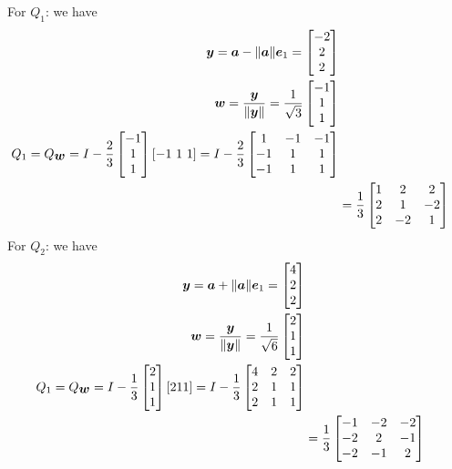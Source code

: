 \documentclass[12pt,a4paper]{article}
\def\a{ {\vc a} }
\def\e{ {\vc e} }
\def\y{ {\vc y} }
\def\w{ {\vc w} }
\begin{document}
For $Q_1$: we have
\begin{align*}
\ensuremath{\bm{\y}} = \ensuremath{\bm{\a}} - \| \ensuremath{\bm{\a}}\| \ensuremath{\bm{\e}}_1 =  \begin{bmatrix} -2 \\ 2 \\ 2 \end{bmatrix} \\
\ensuremath{\bm{\w}} = {\ensuremath{\bm{\y}} \over \|\ensuremath{\bm{\y}}\|} = {1 \over \sqrt{3}} \begin{bmatrix} -1 \\ 1 \\ 1 \end{bmatrix} \\
Q_1 = Q_{\ensuremath{\bm{\w}}} = I - {2 \over 3} \begin{bmatrix} -1 \\ 1 \\ 1 \end{bmatrix}  [-1\ 1\ 1] = 
I - {2 \over 3} \begin{bmatrix} 1 & -1 & -1 \\ -1 & 1 & 1 \\ -1 & 1 & 1 \end{bmatrix} \\
&={1 \over 3} \begin{bmatrix} 1 & 2 & 2 \\ 2 & 1 & -2 \\ 2 & -2 & 1 \end{bmatrix} 
\end{align*}
For $Q_2$: we have
\begin{align*}
\ensuremath{\bm{\y}} = \ensuremath{\bm{\a}} + \| \ensuremath{\bm{\a}}\| \ensuremath{\bm{\e}}_1 =  \begin{bmatrix} 4 \\ 2 \\ 2 \end{bmatrix} \\
\ensuremath{\bm{\w}} = {\ensuremath{\bm{\y}} \over \|\ensuremath{\bm{\y}}\|} = {1 \over \sqrt{6}} \begin{bmatrix} 2 \\ 1 \\ 1 \end{bmatrix} \\
Q_1 = Q_{\ensuremath{\bm{\w}}} = I - {1 \over 3} \begin{bmatrix} 2 \\ 1 \\ 1 \end{bmatrix}  [2 1 1] = 
I - {1 \over 3} \begin{bmatrix} 4 & 2 & 2 \\ 2 & 1  & 1 \\ 2&  1 & 1 \end{bmatrix} \\
&={1 \over 3} \begin{bmatrix} -1 & -2 & -2 \\ -2& 2 &-1 \\ -2& -1& 2 \end{bmatrix} 
\end{align*}
\end{document}
